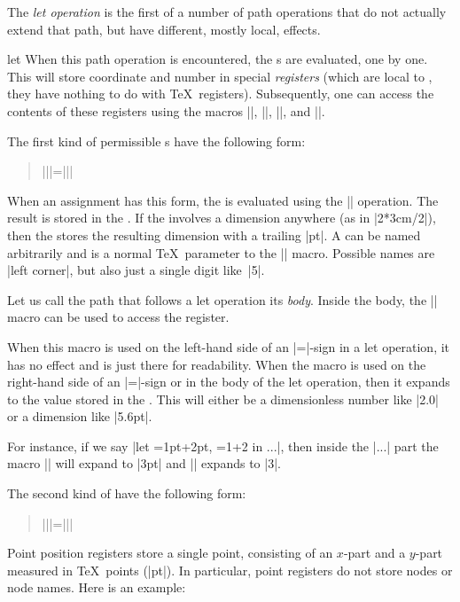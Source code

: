 The \emph{let operation} is the first of a number of path operations that do
not actually extend that path, but have different, mostly local, effects.

\begin{pathoperation}{let}{
        }
    When this path operation is encountered, the s are
    evaluated, one by one. This will store coordinate and number in
    special \emph{registers} (which are local to \tikzname, they have
    nothing to do with \TeX\ registers). Subsequently, one can access the
    contents of these registers using the macros |\p|, |\x|, |\y|, and
    |\n|.

    The first kind of permissible s have the following form:
    \begin{quote}
        |\n||={||}|
    \end{quote}
    When an assignment has this form, the  is evaluated using the
    |\pgfmathparse| operation. The result is stored in the . If the  involves a dimension anywhere (as in
    |2*3cm/2|), then the  stores the resulting dimension
    with a trailing |pt|.  A  can be named arbitrarily
    and is a normal \TeX\ parameter to the |\n| macro. Possible names are
    |{left corner}|, but also just a single digit like~|5|.

    Let us call the path that follows a let operation its \emph{body}. Inside
    the body, the |\n| macro can be used to access the register.
    \begin{command}{\n{}}
        When this macro is used on the left-hand side of an |=|-sign in a let
        operation, it has no effect and is just there for readability. When the
        macro is used on the right-hand side of an |=|-sign or in the body of
        the let operation, then it expands to the value stored in the
        . This will either be a dimensionless number like
        |2.0| or a dimension like |5.6pt|.

        For instance, if we say |let ={1pt+2pt}, ={1+2} in ...|, then
        inside the |...| part the macro || will expand to |3pt| and ||
        expands to |3|.
    \end{command}

    The second kind of  have the following form:
    \begin{quote}
        |\p||={||}|
    \end{quote}
    Point position registers store a single point, consisting of an $x$-part
    and a $y$-part measured in \TeX\ points (|pt|). In particular, point
    registers do not store nodes or node names. Here is an example:
\begin{codeexample}[preamble={\usetikzlibrary{calc}}]
\end{codeexample}
\end{pathoperation}
